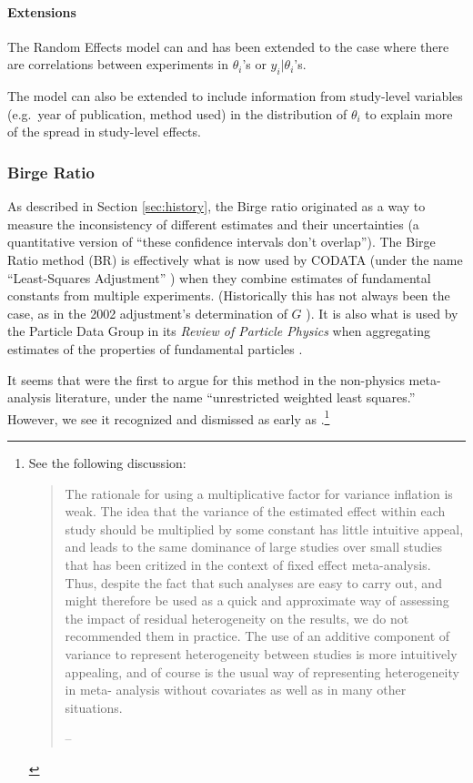 \documentclass[letterpaper,12pt]{article}
\begin{document}
\paragraph{Extensions}\label{extensions}

The Random Effects model can and has been extended to the case where there are correlations between experiments in $\theta_i$'s or $y_i|\theta_i$'s.

The model can also be extended to include information from study-level variables (e.g.~year of publication, method used) in the distribution of $\theta_i$ to explain more of the spread in study-level effects.


\subsubsection{Birge Ratio}\label{sec:birge}

As described in Section \ref{sec:history}, the Birge ratio originated as a way to measure the inconsistency of different estimates and their uncertainties (a quantitative version of ``these confidence intervals don't overlap''). The Birge Ratio method (BR) is effectively what is now used by CODATA (under the name ``Least-Squares Adjustment'' \citep{tiesinga2021codata}) when they combine estimates of fundamental constants from multiple experiments. (Historically this has not always been the case, as in the 2002 adjustment's determination of $G$ \citep{mohr2005codata}). It is also what is used by the Particle Data Group in its \emph{Review of Particle Physics} when aggregating estimates of the properties of fundamental particles \citep[Section 5.2.2]{navas2024review}.

It seems that \citet{stanley2015neither} were the first to argue for this method in the non-physics meta-analysis literature, under the name ``unrestricted weighted least squares.'' However, we see it recognized and dismissed as early as \citet{thompson1999explaining}.\footnote{See the following discussion:
  \begin{quote}
The rationale for using a multiplicative factor for variance inflation is weak. The idea that the
variance of the estimated effect within each study should be multiplied by some constant has little
intuitive appeal, and leads to the same dominance of large studies over small studies that has
been critized in the context of fixed effect meta-analysis. Thus, despite the fact that such
analyses are easy to carry out, and might therefore be used as a quick and approximate way of
assessing the impact of residual heterogeneity on the results, we do not recommended them in
practice. The use of an additive component of variance to represent heterogeneity between studies
is more intuitively appealing, and of course is the usual way of representing heterogeneity in meta-
analysis without covariates as well as in many other situations.

\hfill{-- \citet[pg. 2705]{thompson1999explaining}}
  \end{quote}
}
\end{document}
